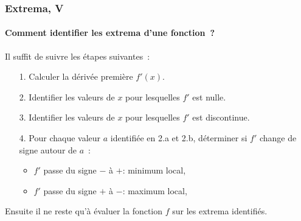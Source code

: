 \documentclass[10pt,notheorems]{beamer}
\theoremstyle{plain}
\theoremstyle{definition} %
\begin{document}
\begin{frame}
  \frametitle{Extrema, V}
  \framesubtitle{Comment identifier les extrema d'une fonction~?}

  Il suffit de suivre les étapes suivantes~:

  \bigskip

  \begin{itemize}

  \item[1.] Calculer la dérivée première $f'(x)$.\newline

  \item[2.] Identifier les valeurs de $x$ pour lesquelles $f'$ est nulle.\newline

  \item[3.] Identifier les valeurs de $x$ pour lesquelles $f'$ est discontinue.\newline

  \item[4.] Pour chaque valeur $a$ identifiée en 2.a et 2.b, déterminer si $f'$ change de signe autour de $a$~:\newline
    \begin{itemize}
    \item $f'$ passe du signe $-$ à $+$: minimum local,
    \item $f'$ passe du signe $+$ à $-$: maximum local,

    \end{itemize}

  \end{itemize}

  \bigskip

  Ensuite il ne reste qu'à évaluer la fonction $f$ sur les extrema identifiés.

\end{frame}
\end{document}
